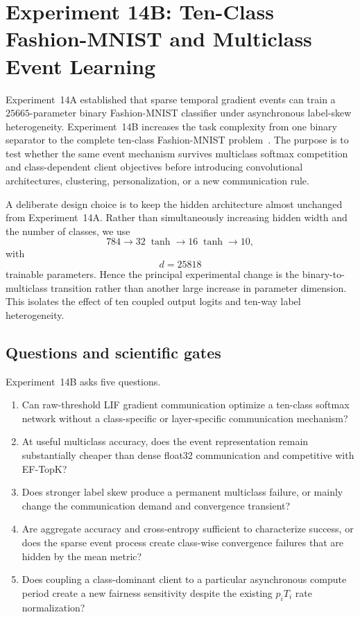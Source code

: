 \section{Experiment 14B: Ten-Class Fashion-MNIST and Multiclass Event Learning}
\label{sec:exp14b}

Experiment~14A established that sparse temporal gradient events can train a $25665$-parameter binary Fashion-MNIST classifier under asynchronous label-skew heterogeneity. Experiment~14B increases the task complexity from one binary separator to the complete ten-class Fashion-MNIST problem~\cite{xiao2017fashionmnist}. The purpose is to test whether the same event mechanism survives multiclass softmax competition and class-dependent client objectives before introducing convolutional architectures, clustering, personalization, or a new communication rule.

A deliberate design choice is to keep the hidden architecture almost unchanged from Experiment~14A. Rather than simultaneously increasing hidden width and the number of classes, we use
\begin{equation}
784\rightarrow32\;\tanh\rightarrow16\;\tanh\rightarrow10,
\end{equation}
with
\begin{equation}
\boxed{d=25818}
\end{equation}
trainable parameters. Hence the principal experimental change is the binary-to-multiclass transition rather than another large increase in parameter dimension. This isolates the effect of ten coupled output logits and ten-way label heterogeneity.

\subsection{Questions and scientific gates}

Experiment~14B asks five questions.
\begin{enumerate}
    \item Can raw-threshold LIF gradient communication optimize a ten-class softmax network without a class-specific or layer-specific communication mechanism?
    \item At useful multiclass accuracy, does the event representation remain substantially cheaper than dense float32 communication and competitive with EF-TopK?
    \item Does stronger label skew produce a permanent multiclass failure, or mainly change the communication demand and convergence transient?
    \item Are aggregate accuracy and cross-entropy sufficient to characterize success, or does the sparse event process create class-wise convergence failures that are hidden by the mean metric?
    \item Does coupling a class-dominant client to a particular asynchronous compute period create a new fairness sensitivity despite the existing $p_iT_i$ rate normalization?
\end{enumerate}

